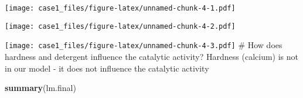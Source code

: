 \documentclass[
]{article}
\newenvironment{Shaded}{\begin{snugshade}}{\end{snugshade}}
\newcommand{\DataTypeTok}[1]{\textcolor[rgb]{0.13,0.29,0.53}{#1}}
\newcommand{\DecValTok}[1]{\textcolor[rgb]{0.00,0.00,0.81}{#1}}
\newcommand{\KeywordTok}[1]{\textcolor[rgb]{0.13,0.29,0.53}{\textbf{#1}}}
\newcommand{\NormalTok}[1]{#1}
\newcommand{\OperatorTok}[1]{\textcolor[rgb]{0.81,0.36,0.00}{\textbf{#1}}}
\newcommand{\StringTok}[1]{\textcolor[rgb]{0.31,0.60,0.02}{#1}}
\begin{document}
\texttt{[image: case1\_files/figure-latex/unnamed-chunk-4-1.pdf]}

\begin{Shaded}
\end{Shaded}

\texttt{[image: case1\_files/figure-latex/unnamed-chunk-4-2.pdf]}

\begin{Shaded}
\end{Shaded}

\texttt{[image: case1\_files/figure-latex/unnamed-chunk-4-3.pdf]} \# How
does hardness and detergent influence the catalytic activity? Hardness
(calcium) is not in our model - it does not influence the catalytic
activity

\begin{Shaded}
\begin{Highlighting}[]
\KeywordTok{summary}\NormalTok{(lm.final)}
\end{Highlighting}
\end{Shaded}
\end{document}
